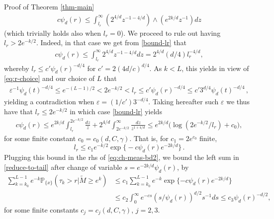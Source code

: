 \documentclass[12pt,reqno]{amsart}
\numberwithin{equation}{section}
\theoremstyle{definition}
\begin{document}
\begin{section}{Proof of Theorem \ref{thm-main}}
\begin{align}
c \psi_d(r) \le \int_{l_r}^{\infty} (2^{4/d}z^{-1-4/d})\wedge (e^{2k/d}z^{-1})dz  \label{bound-lr}
\end{align}
(which trivially 
holds also when $l_r=0$).
We proceed to rule out having $l_r > 2e^{-k/2}$. Indeed, in that case
we get from \eqref{bound-lr} that 
\begin{align*}
c \psi_d(r)\le\int_{l_r}^\infty 2^{4/d}z^{-1-4/d}dz=2^{4/d}(d/4)l_r^{-4/d},
\end{align*}
whereby $l_r\le c'\psi_d(r)^{-d/4}$ for $c'=2(4d/c)^{d/4}$. As 
$k<L$, this yields in view of \eqref{eq:r-choice} and our choice of $L$ that
\begin{align*}
{\varepsilon}^{-1} \psi_d(t)^{-d/4} \le e^{-(L-1)/2} < 2 e^{-k/2}
<l_r\le c'\psi_d(r)^{-d/4} \le c' 3^{d/4} \psi_d(t)^{-d/4} \,, 
\end{align*}
yielding a contradiction when ${\varepsilon}= (1/c') 3^{-d/4}$.  
Taking hereafter such ${\varepsilon}$ we thus have that $l_r \le 2e^{-k/2}$ in which case
\eqref{bound-lr} yields 
\begin{align*}
c \psi_d(r) \le e^{2k/d} \int_{l_r}^{2e^{-k/2}} \frac{dz}{z} +
2^{4/d} \int_{2e^{-k/2}}^{\infty} \frac{dz}{z^{1+4/d}} 
\le e^{2k/d}\big(\log (2 e^{-k/2}/l_r) + c_0\big),
\end{align*}
for some finite constant $c_0=c_0(d,C,\gamma)$. That is, for $c_1 = 2 e^{c_0}$ finite,
$$
l_r \le c_1 e^{-k/2} \exp\big\{- c \psi_d(r)e^{-2k/d}\big\} \,.
$$
Plugging this bound in the {{\sc\lowercase{{rhs}}}} of \eqref{eq:ch-meas-bd2}, we bound
the left sum in \eqref{reduce-to-tail} after change of variable 
$s=e^{-2k/d}\psi_d(r)$, by
\begin{align}
\sum_{k=k_0}^{L-1}e^{-k}{\mathbb{P}}_{\{x\}}(\tau_k>r|{{\widetilde{M}\ge e^k}})&\le c_1 
\sum_{k=k_0}^{L-1} e^{-k} \exp\{-c \psi_d(r)e^{-2k/d}\}\nonumber\\
&\le c_2\int_0^\infty e^{-c s}(s/\psi_d(r))^{d/2}s^{-1}ds\le  c_3\psi_d(r)^{-d/2}, \label{bound-1}
\end{align}
for some finite constants $c_j=c_j(d,C,\gamma)$, $j=2,3$.


\end{section}
\end{document}

